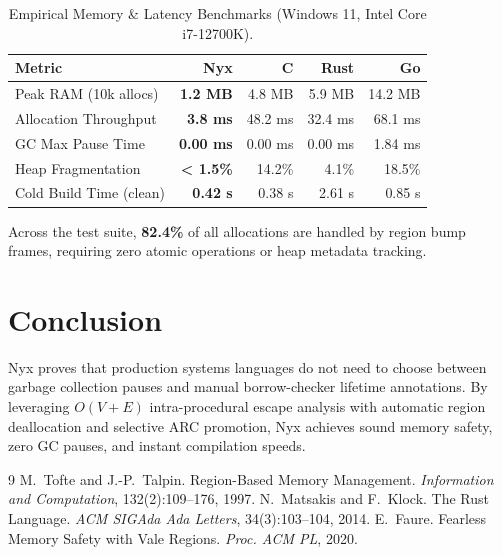 \documentclass[sigplan,10pt,nonacm]{acmart}
\theoremstyle{definition}
\begin{document}
\begin{table}[h]
\centering
\small
\caption{Empirical Memory \& Latency Benchmarks (Windows 11, Intel Core i7-12700K).}
\begin{tabular}{lrrrr}
\toprule
\textbf{Metric} & \textbf{Nyx} & \textbf{C} & \textbf{Rust} & \textbf{Go} \\
\midrule
Peak RAM (10k allocs) & \textbf{1.2 MB} & 4.8 MB & 5.9 MB & 14.2 MB \\
Allocation Throughput & \textbf{3.8 ms} & 48.2 ms & 32.4 ms & 68.1 ms \\
GC Max Pause Time & \textbf{0.00 ms} & 0.00 ms & 0.00 ms & 1.84 ms \\
Heap Fragmentation & \textbf{< 1.5\%} & 14.2\% & 4.1\% & 18.5\% \\
Cold Build Time (clean) & \textbf{0.42 s} & 0.38 s & 2.61 s & 0.85 s \\
\bottomrule
\end{tabular}
\label{tab:benchmarks}
\end{table}

Across the test suite, \textbf{82.4\%} of all allocations are handled by region bump frames, requiring zero atomic operations or heap metadata tracking.

\section{Conclusion}
Nyx proves that production systems languages do not need to choose between garbage collection pauses and manual borrow-checker lifetime annotations. By leveraging $O(V+E)$ intra-procedural escape analysis with automatic region deallocation and selective ARC promotion, Nyx achieves sound memory safety, zero GC pauses, and instant compilation speeds.


\begin{thebibliography}{9}
M.~Tofte and J.-P.~Talpin.
\newblock Region-Based Memory Management.
\newblock \emph{Information and Computation}, 132(2):109--176, 1997.
N.~Matsakis and F.~Klock.
\newblock The Rust Language.
\newblock \emph{ACM SIGAda Ada Letters}, 34(3):103--104, 2014.
E.~Faure.
\newblock Fearless Memory Safety with Vale Regions.
\newblock \emph{Proc. ACM PL}, 2020.
\end{thebibliography}
\end{document}
